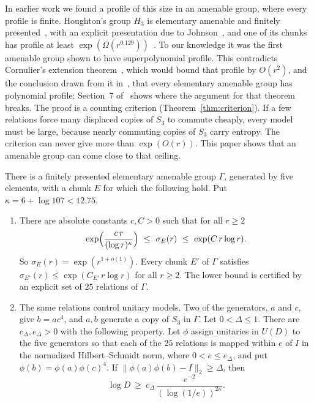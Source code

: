 In earlier work we found a profile of this size in an amenable group, where every profile is finite. Houghton's group $H_3$ is elementary amenable and finitely
presented~\cite{Brown1987}, with an explicit presentation due to Johnson~\cite{Johnson1999}, and one of its chunks has profile at least
$\exp(\Omega(r^{0.129}))$~\cite{DouglasMghirbiA}. To our knowledge it was the first amenable group shown to have superpolynomial profile. This contradicts
Cornulier's extension theorem~\cite[Theorem~3.15]{Cornulier2013}, which would bound that profile by $O(r^2)$, and the conclusion drawn from
it in~\cite[Example~3.16]{Cornulier2013}, that every elementary amenable group has polynomial profile; Section~7 of~\cite{DouglasMghirbiA}
shows where the argument for that theorem breaks. The
proof is a counting criterion (Theorem~\ref{thm:criterion}). If a few relations force many displaced copies of $S_3$ to commute cheaply, every
model must be large, because nearly commuting copies of $S_3$ carry entropy. The criterion can never give more than $\exp(O(r))$. This paper
shows that an amenable group can come close to that ceiling.

\begin{theoremA}
There is a finitely presented elementary amenable group $\Gamma$, generated by five elements, with a chunk $E$ for which the following hold.
Put $\kappa=6+\log107<12.75$.
\begin{enumerate}[label=(\alph*),itemsep=1pt]
\item There are absolute constants $c,C>0$ such that for all $r\ge2$
\[
\exp\Bigl(\frac{c\,r}{(\log r)^{\kappa}}\Bigr)\ \le\ \sigma_E(r)\ \le\ \exp(C\,r\log r).
\]
So $\sigma_E(r)=\exp(r^{1+o(1)})$. Every chunk $E'$ of $\Gamma$ satisfies $\sigma_{E'}(r)\le\exp(C_{E'}\,r\log r)$ for all $r\ge2$. The lower
bound is certified by an explicit set of $25$ relations of $\Gamma$.
\item The same relations control unitary models. Two of the generators, $a$ and $c$, give $b=ac^4$, and $a,b$ generate a copy of $S_3$ in
$\Gamma$. Let $0<\Delta\le1$. There are $c_\Delta,e_\Delta>0$ with the following property. Let $\phi$ assign unitaries in $U(D)$ to the five
generators so that each of the $25$ relations is mapped within $e$ of $I$ in the normalized Hilbert--Schmidt norm, where $0<e\le e_\Delta$,
and put $\phi(b)=\phi(a)\phi(c)^4$. If $\|\phi(a)\phi(b)-I\|_2\ge\Delta$, then
\[
\log D\ \ge\ c_\Delta\,\frac{e^{-2}}{(\log(1/e))^{2\kappa}} .
\]
\end{enumerate}
\end{theoremA}

